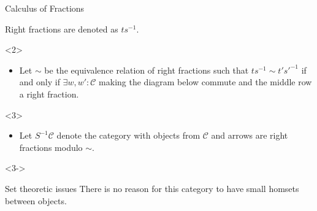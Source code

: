 \documentclass{beamer}
\begin{document}
\begin{frame}{Calculus of Fractions}
\begin{onlyenv}
\begin{definition}
\begin{center}
\begin{tikzcd}[ampersand replacement=\&]
                            \end{tikzcd}
                        \end{center}
                        Right fractions are denoted as $ts^{-1}$. \\
                        \begin{onlyenv}<2>
                            \begin{itemize}
                                \item Let $\sim$ be the equivalence relation of right fractions such that $ts^{-1}\sim t's'^{-1}$ if and only if $\exists w,w':\mathcal{C}$ making the diagram below commute and the middle row a right fraction.
                            \end{itemize}
                            \begin{center}
                            \end{center}
                        \end{onlyenv}
                        \begin{onlyenv}<3>
                            \begin{itemize}
                                \item Let $S^{-1}\mathcal{C}$ denote the category with objects from $\mathcal{C}$ and arrows are right fractions modulo $\sim$.
                            \end{itemize}
                        \end{onlyenv}
                    \end{definition}
                    \begin{onlyenv}<3->
                        \begin{alertblock}{Set theoretic issues}
                            There is no reason for this category to have small homsets between objects.
                        \end{alertblock}
                    \end{onlyenv}
                \end{onlyenv}
            \end{frame}
\end{document}
